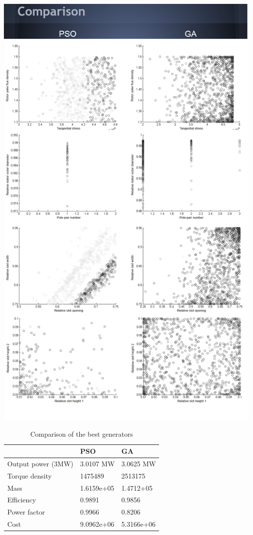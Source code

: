\documentclass[twoside]{article}
\begin{document}
\includegraphics[width=\textwidth,height=\textheight,keepaspectratio]{results2.png}
\newpage
\centering
\begin{table}
\caption{Comparison of the best generators}
\centering
\begin{tabular}{  l  l  l  }

	 & PSO & GA \\ \hline
	Output power (3MW) & 3.0107 MW & 3.0625 MW \\ 
	Torque density & 1475489 & 2513175 \\ 
	Mass & 1.6159e+05 & 1.4712+05 \\ 
	Efficiency & 0.9891 & 0.9856 \\ 
	Power factor & 0.9966 & 0.8206 \\ 
	Cost & 9.0962e+06 & 5.3166e+06 \\ 
\end{tabular}

\end{table}
\clearpage
\end{document}
